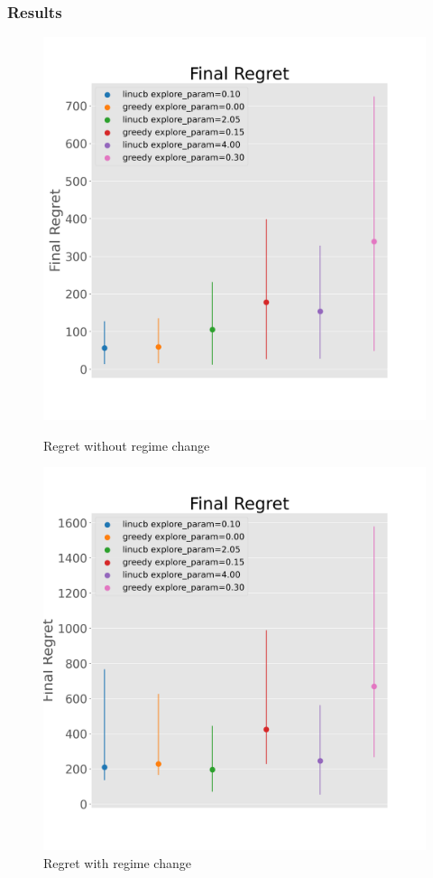 \documentclass{beamer}
\begin{document}
\begin{frame}{}
    \frametitle{Results}

\begin{figure}[!h]
  \centering
  \begin{minipage}{.45\textwidth}
    \centering
    \includegraphics[width=\linewidth]{epsilon_vs_linucb_blobs}
    \caption{Regret without regime change}\label{fig:linucb-blobs-regret-no-regime-change}
  \end{minipage}%
  \begin{minipage}{.45\textwidth}
    \centering
    \includegraphics[width=\linewidth]{epsilon_vs_linucb_blobs_regime_change}
    \caption{Regret with regime change}\label{fig:linucb-blobs-regret-regime-change}
  \end{minipage}
\end{figure}
\end{frame}
\end{document}
